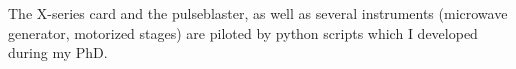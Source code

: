 \documentclass[a4paper, 11pt]{report}
\begin{document}
The X-series card and the pulseblaster, as well as several instruments (microwave generator, motorized stages) are piloted by python scripts which I developed during my PhD.
%
%
%
\end{document}
